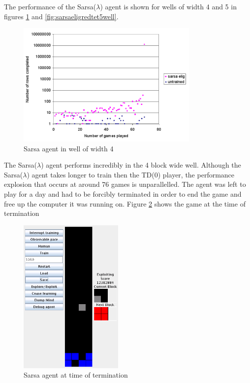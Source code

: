 \documentclass{rucsthesis}
\begin{document}
The performance of the Sarsa($\lambda$) agent is shown for wells of width 4 and 5 in figures \ref{fig:sarsaeligredtet4well} and \ref{fig:sarsaeligredtet5well}.

\begin{figure}[h]
\centering
\includegraphics[width=3.5in]{sarsaeligredtet4well.png}
\caption{Sarsa agent in well of width 4}
\label{fig:sarsaeligredtet4well}
\end{figure}

The Sarsa($\lambda$) agent performs incredibly in the 4 block wide well. Although the Sarsa($\lambda$) agent takes longer to train then the TD(0) player, the performance explosion that occurs at around 76 games is unparallelled. The agent was left to play for a day and had to be forcibly terminated in order to end the game and free up the computer it was running on. Figure \ref{fig:sarsaelig4term} shows the game at the time of termination 

\begin{figure}[h]
\centering
\includegraphics[width=2in]{sarsaelig4term.png}
\caption{Sarsa agent at time of termination}
\label{fig:sarsaelig4term}
\end{figure}
\end{document}
